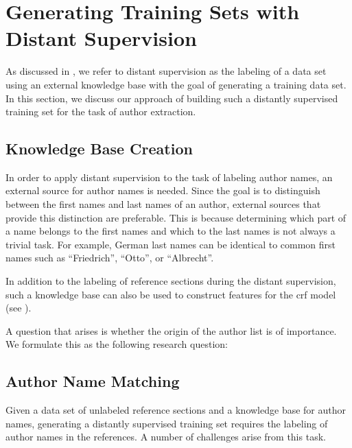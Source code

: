 \section{Generating Training Sets with Distant Supervision}\label{sec:ae-distant-supervision}

As discussed in , we refer to distant supervision as the labeling of a data set using an external knowledge base with the goal of generating a training data set.
In this section, we discuss our approach of building such a distantly supervised training set for the task of author extraction.

\subsection{Knowledge Base Creation}\label{subsec:ae-knowledge-base-creation}

In order to apply distant supervision to the task of labeling author names, an external source for author names is needed.
Since the goal is to distinguish between the first names and last names of an author, external sources that provide this distinction are preferable.
This is because determining which part of a name belongs to the first names and which to the last names is not always a trivial task.
For example, German last names can be identical to common first names such as ``Friedrich'', ``Otto'', or ``Albrecht''.

In addition to the labeling of reference sections during the distant supervision, such a knowledge base can also be used to construct features for the \gls{crf} model (see ).

\bigskip

A question that arises is whether the origin of the author list is of importance.
We formulate this as the following research question:
\newcommand\researchquestionone{}
\researchquestionone%

\subsection{Author Name Matching}\label{subsec:ae-author-name-matching}

Given a data set of unlabeled reference sections and a knowledge base for author names, generating a distantly supervised training set requires the labeling of author names in the references.
A number of challenges arise from this task.

